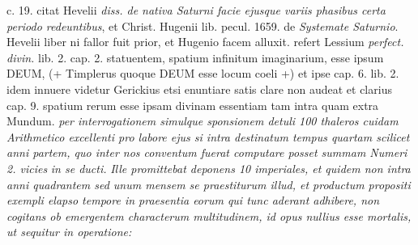             \pstart {} c. 19. citat Hevelii\protect{} \textit{diss. de nativa Saturni facie ejusque variis phasibus certa periodo redeuntibus}, et Christ. Hugenii\protect{} lib. pecul. 1659.  de \textit{Systemate Saturnio}. Hevelii\protect{} liber ni fallor  fuit prior, et Hugenio\protect{} facem alluxit.\pend \pstart {} refert Lessium\protect{} \textit{perfect. divin.}  lib. 2. cap. 2. statuentem, spatium infinitum imaginarium, esse ipsum DEUM, (+ Timplerus\protect{} quoque DEUM esse locum coeli +)  et ipse cap. 6. lib. 2. idem innuere  videtur Gerickius\protect{} etsi enuntiare satis clare non audeat  et clarius cap. 9. spatium rerum esse ipsam divinam essentiam tam intra quam extra Mundum\protect{}.\pend \pstart {} \textit{per interrogationem simulque  sponsionem detuli 100 thaleros cuidam Arithmetico excellenti pro labore ejus si intra destinatum tempus quartam scilicet anni partem, quo  inter nos conventum fuerat computare posset  summam Numeri 2. vicies }\textit{ in se ducti.} \textit{Ille promittebat deponens 10 imperiales, et quidem non  intra anni quadrantem sed unum mensem se praestiturum illud, et productum propositi exempli elapso tempore in praesentia eorum qui tunc aderant  adhibere, non cogitans ob emergentem characterum multitudinem, id opus nullius esse mortalis,  ut sequitur in operatione:} \pend 
